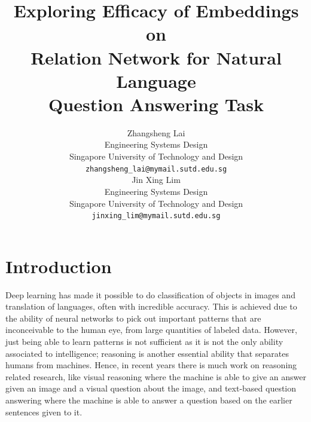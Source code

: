 \documentclass{article}
\title{Exploring Efficacy of Embeddings on \\ Relation Network for Natural Language \\ Question Answering Task}
\author{
Zhangsheng Lai \\
Engineering Systems Design\\
  Singapore University of Technology and Design\\
  \texttt{zhangsheng\_lai@mymail.sutd.edu.sg} \\
\And
Jin Xing Lim \\
Engineering Systems Design\\
  Singapore University of Technology and Design\\
  \texttt{jinxing\_lim@mymail.sutd.edu.sg} \\  %
}
\begin{document}

\maketitle



\section{Introduction}
%

	Deep learning has made it possible to do classification of objects in images and translation of languages, often with incredible accuracy. This is achieved due to the ability of neural networks to pick out important patterns that are inconceivable to the human eye, from large quantities of labeled data. However, just being able to learn patterns is not sufficient as it is not the only ability associated to intelligence; reasoning is another essential ability \cite{Bottou2011} that separates humans from machines. Hence, in recent years there is much work on reasoning related research, like visual reasoning \cite{Johnson2017, Santoro2017} where the machine is able to give an answer given an image and a visual question about the image, and text-based question answering \cite{Santoro2017} where the machine is able to answer a question based on the earlier sentences given to it. 
\end{document}
